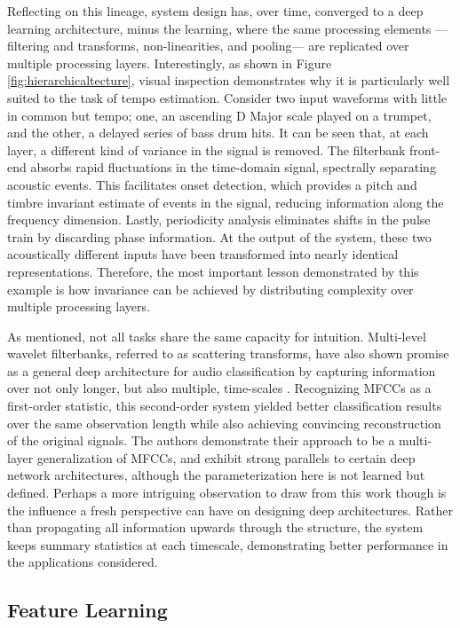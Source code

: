 Reflecting on this lineage, system design has, over time, converged to a deep learning architecture, minus the learning, where the same processing elements ---filtering and transforms, non-linearities, and pooling--- are replicated over multiple processing layers.
Interestingly, as shown in Figure \ref{fig:hierarchicaltecture}, visual inspection demonstrates why it is particularly well suited to the task of tempo estimation.
Consider two input waveforms with little in common but tempo; one, an ascending D Major scale played on a trumpet, and the other, a delayed series of bass drum hits.
It can be seen that, at each layer, a different kind of variance in the signal is removed.
The filterbank front-end absorbs rapid fluctuations in the time-domain signal, spectrally separating acoustic events.
This facilitates onset detection, which provides a pitch and timbre invariant estimate of events in the signal, reducing information along the frequency dimension.
Lastly, periodicity analysis eliminates shifts in the pulse train by discarding phase information.
At the output of the system, these two acoustically different inputs have been transformed into nearly identical representations.
Therefore, the most important lesson demonstrated by this example is how invariance can be achieved by distributing complexity over multiple processing layers.

As mentioned, not all tasks share the same capacity for intuition.
Multi-level wavelet filterbanks, referred to as scattering transforms, have also shown promise as a general deep architecture for audio classification by capturing information over not only longer, but also multiple, time-scales \cite{Anden2011Multiscale}.
Recognizing MFCCs as a first-order statistic, this second-order system yielded better classification results over the same observation length while also achieving convincing reconstruction of the original signals.
The authors demonstrate their approach to be a multi-layer generalization of MFCCs, and exhibit strong parallels to certain deep network architectures, although the parameterization here is not learned but defined.
Perhaps a more intriguing observation to draw from this work though is the influence a fresh perspective can have on designing deep architectures.
Rather than propagating all information upwards through the structure, the system keeps summary statistics at each timescale, demonstrating better performance in the applications considered.


\subsection{Feature Learning}
\label{subsec:feature_learning}

